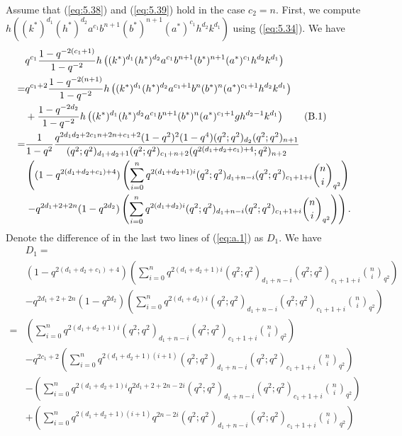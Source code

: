 \documentclass[table,a4paper,reqno]{amsart}
\numberwithin{equation}{section}
\theoremstyle{definition}
\begin{document}
Assume that (\ref{eq:5.38}) and (\ref{eq:5.39}) hold in the case $c_2=n$. First, we compute $h\left((k^*)^{d_1}(h^*)^{d_2}a^{c_1}b^{n+1}(b^*)^{n+1}(a^*)^{c_1}h^{d_2}k^{d_1}\right)$ using (\ref{eq:5.34}). We have
\begin{align}\label{eq:a.1}\stepcounter{equation}
        &q^{c_1}\frac{1-q^{-2(c_1+1)}}{1-q^{-2}}h\left((k^*)^{d_1}(h^*)^{d_2}a^{c_1}b^{n+1}(b^*)^{n+1}(a^*)^{c_1}h^{d_2}k^{d_1}\right)\notag\\
        =&q^{c_1+2}\frac{1-q^{-2(n+1)}}{1-q^{-2}}h\left((k^*)^{d_1}(h^*)^{d_2}a^{c_1+1}b^{n}(b^*)^{n}(a^*)^{c_1+1}h^{d_2}k^{d_1}\right)\notag\\
        &+\frac{1-q^{-2d_2}}{1-q^{-2}}h\left((k^*)^{d_1}(h^*)^{d_2}a^{c_1}b^{n+1}(b^*)^{n}(a^*)^{c_1+1}gh^{d_2-1}k^{d_1}\right)\tag{B.1}\\
        =&\frac{1}{1-q^{2}}\frac{q^{2d_1d_2+2c_1n+2n+c_1+2}(1-q^2)^2(1-q^4)(q^2;q^2)_{d_2}(q^2;q^2)_{n+1}}{(q^2;q^2)_{d_1+d_2+1}(q^2;q^2)_{c_1+n+2}(q^{2(d_1+d_2+c_1)+4};q^2)_{n+2}}\notag\\
        &\left((1-q^{2(d_1+d_2+c_1)+4})\left(\sum_{i=0}^{n}q^{2(d_1+d_2+1)i}(q^2;q^2)_{d_1+n-i}(q^2;q^2)_{c_1+1+i}{n\choose i}_{q^2}\right)\right.\notag\\
        &\left.-q^{2d_1+2+2n}(1-q^{2d_2})\left(\sum_{i=0}^{n}q^{2(d_1+d_2)i}(q^2;q^2)_{d_1+n-i}(q^2;q^2)_{c_1+1+i}{n\choose i}_{q^2}\right)\right).\notag
\end{align}
Denote the difference of in the last two lines of (\ref{eq:a.1}) as $D_1$. We have
\begin{equation}
    \begin{split}
        &D_1=\\
        &(1-q^{2(d_1+d_2+c_1)+4})\left(\sum_{i=0}^{n}q^{2(d_1+d_2+1)i}(q^2;q^2)_{d_1+n-i}(q^2;q^2)_{c_1+1+i}{n\choose i}_{q^2}\right)\\
        &-q^{2d_1+2+2n}(1-q^{2d_2})\left(\sum_{i=0}^{n}q^{2(d_1+d_2)i}(q^2;q^2)_{d_1+n-i}(q^2;q^2)_{c_1+1+i}{n\choose i}_{q^2}\right)\\
        =&\left(\sum_{i=0}^{n}q^{2(d_1+d_2+1)i}(q^2;q^2)_{d_1+n-i}(q^2;q^2)_{c_1+1+i}{n\choose i}_{q^2}\right)\\
        &-q^{2c_1+2}\left(\sum_{i=0}^{n}q^{2(d_1+d_2+1)(i+1)}(q^2;q^2)_{d_1+n-i}(q^2;q^2)_{c_1+1+i}{n\choose i}_{q^2}\right)\\
        &-\left(\sum_{i=0}^{n}q^{2(d_1+d_2+1)i}q^{2d_1+2+2n-2i}(q^2;q^2)_{d_1+n-i}(q^2;q^2)_{c_1+1+i}{n\choose i}_{q^2}\right)\\
        &+\left(\sum_{i=0}^{n}q^{2(d_1+d_2+1)(i+1)}q^{2n-2i}(q^2;q^2)_{d_1+n-i}(q^2;q^2)_{c_1+1+i}{n\choose i}_{q^2}\right)\\
    \end{split}
\end{equation}
\end{document}

